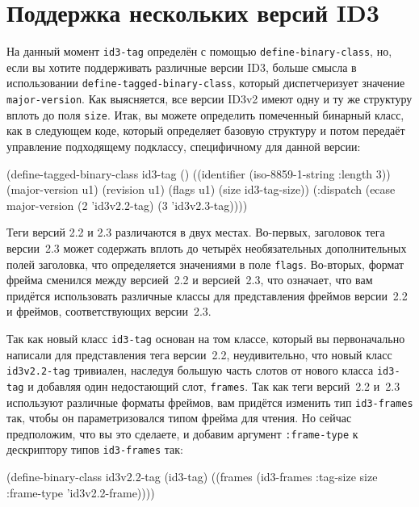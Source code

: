 \section{Поддержка нескольких версий ID3}

На данный момент \lstinline{id3-tag} определён с помощью \lstinline{define-binary-class}, но, если
вы хотите поддерживать различные версии ID3, больше смысла в использовании
\lstinline{define-tagged-binary-class}, который диспетчеризует значение
\lstinline{major-version}. Как выясняется, все версии ID3v2 имеют одну и ту же структуру вплоть
до поля \lstinline{size}. Итак, вы можете определить помеченный бинарный класс, как в следующем
коде, который определяет базовую структуру и потом передаёт управление подходящему
подклассу, специфичному для данной версии:

\begin{myverb}
(define-tagged-binary-class id3-tag ()
  ((identifier     (iso-8859-1-string :length 3))
   (major-version  u1)
   (revision       u1)
   (flags          u1)
   (size           id3-tag-size))
  (:dispatch 
   (ecase major-version
     (2 'id3v2.2-tag)
     (3 'id3v2.3-tag))))
\end{myverb}

Теги версий 2.2 и 2.3 различаются в двух местах. Во-первых, заголовок тега версии~2.3
может содержать вплоть до четырёх необязательных дополнительных полей заголовка, что
определяется значениями в поле \lstinline{flags}. Во-вторых, формат фрейма сменился между
версией~2.2 и версией~2.3, что означает, что вам придётся использовать различные классы
для представления фреймов версии~2.2 и фреймов, соответствующих версии~2.3.

Так как новый класс \lstinline{id3-tag} основан на том классе, который вы первоначально
напи\-сали для представления тега версии~2.2, неудивительно, что новый класс
\lstinline{id3v2.2-tag} тривиален, наследуя большую часть слотов от нового класса
\lstinline{id3-tag} и добавляя один недостающий слот, \lstinline{frames}. Так как теги версий~2.2
и~2.3 используют различные форматы фреймов, вам придётся изменить тип \lstinline{id3-frames}
так, чтобы он параметризовался типом фрейма для чтения. Но сейчас предположим, что вы это
сделаете, и добавим аргумент \lstinline{:frame-type} к дескриптору типов \lstinline{id3-frames} так:

\begin{myverb}
(define-binary-class id3v2.2-tag (id3-tag)
  ((frames (id3-frames :tag-size size :frame-type 'id3v2.2-frame))))
\end{myverb}

